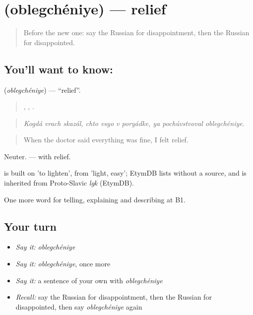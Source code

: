 \section[\texorpdfstring{\ru{облегчение} (oblegchéniye)}{облегчение (oblegchéniye)}]{ (oblegchéniye) — relief}

\label{lesson:RU-C473-oblegcheniye}



\begin{quote}
Before the new one: say the Russian for disappointment, then the Russian for disappointed.
\end{quote}

\subsection*{You'll want to know: }
\textbf{} (\emph{oblegchéniye}) — \textquotedblleft{}relief\textquotedblright{}.

\begin{quote}
  ,    ,   .
\end{quote}

\begin{quote}
\emph{Kogdá vrach skazál, chto vsyo v poryádke, ya pochúvstvoval oblegchéniye.}
\end{quote}

\begin{quote}
When the doctor said everything was fine, I felt relief.
\end{quote}

Neuter. \emph{ } — with relief.

\begin{cousinweb}
\emph{} is built on \emph{} 'to lighten', from \emph{} 'light, easy'; EtymDB lists \emph{} without a source, and \emph{} is inherited from Proto-Slavic \emph{lgk} (EtymDB).
\end{cousinweb}

\begin{grammarlens}[title={What you've built}]
One more word for telling, explaining and describing at B1.
\end{grammarlens}

\subsection*{Your turn}
\begin{itemize}
\raggedright
  \item \emph{Say it:} \emph{oblegchéniye}
  \item \emph{Say it:} \emph{oblegchéniye}, once more
  \item \emph{Say it:} a sentence of your own with \emph{oblegchéniye}
  \item \emph{Recall:} say the Russian for disappointment, then the Russian for disappointed, then say \emph{oblegchéniye} again
\end{itemize}

